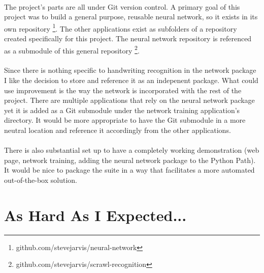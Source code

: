 \documentclass{article}
\begin{document}
    \paragraph{}The project's parts are all under Git version control. A primary 
    goal of this project was to build a general purpose, reusable neural network, 
    so it exists in its own repository
    \footnote{github.com/stevejarvis/neural-network}. The other applications exist
    as subfolders of a repository created specifically for this project. The
    neural network repository is referenced as a submodule of this general 
    repository
    \footnote{github.com/stevejarvis/scrawl-recognition}.

    \paragraph{}Since there is nothing specific to handwriting recognition in the
    network package I like the decision to store and reference it as an indepenent
    package. What could use improvement is the way the network is 
    incorporated with the rest of the project. There are multiple applications 
    that rely on the neural network package yet it is added as a Git submodule 
    under the network training application's directory. It would be more 
    appropriate to have the Git submodule in a more neutral location and
    reference it accordingly from the other applications. 
    
    \paragraph{}There is also substantial set up to have a completely working
    demonstration (web page, network training, adding the neural network package
    to the Python Path). It would be nice to package the suite in a way that 
    facilitates a more automated out-of-the-box solution.

\section{As Hard As I Expected...}
\end{document}
